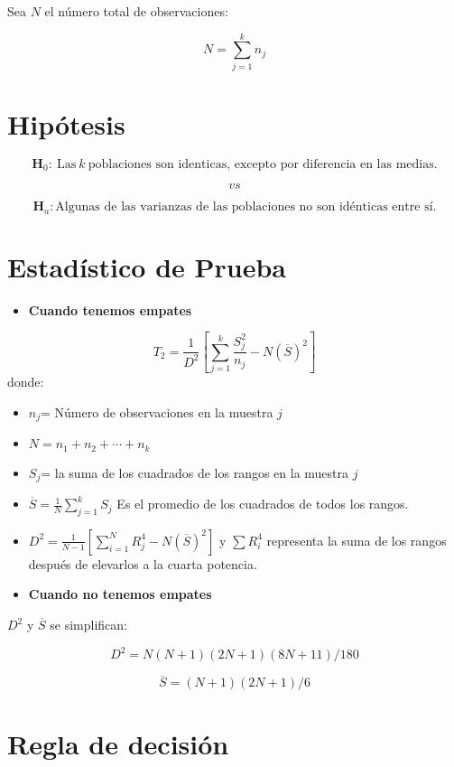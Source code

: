 \documentclass[
  a4paper,
  oneside,
  openany]{book}
\providecommand{\tightlist}{%
  \setlength{\itemsep}{0pt}\setlength{\parskip}{0pt}}
\begin{document}
Sea \(N\) el número total de observaciones:

\[N=\sum_{j=1}^k n_j\]

\hypertarget{hipuxf3tesis-8}{%
\section{Hipótesis}\label{hipuxf3tesis-8}}

\[\textbf{H}_0: \ \mbox{Las} \  k  \ \mbox{poblaciones son identicas, excepto por diferencia en las medias.}\]

\[vs\]

\[\textbf{H}_a: \mbox{Algunas de las varianzas de las poblaciones no son idénticas entre sí.}\]

\hypertarget{estaduxedstico-de-prueba-8}{%
\section{Estadístico de Prueba}\label{estaduxedstico-de-prueba-8}}

\begin{itemize}
\tightlist
\item
  \textbf{Cuando tenemos empates}
\end{itemize}

\[T_{2}= \frac{1}{D^2}\left[\sum_{j=1}^{k}\frac{S_{j}^2}{n_j}-N(\overline{S})^2\right]\]
donde:

\begin{itemize}
\item
  \(n_{j}\)= Número de observaciones en la muestra \(j\)
\item
  \(N= n_{1}+n_{2}+\cdots+n_{k}\)
\item
  \(S_{j}\)= la suma de los cuadrados de los rangos en la muestra \(j\)
\item
  \(\overline{S}= \frac{1}{N}\sum_{j=1}^{k}S_{j}\) Es el promedio de los cuadrados de todos los rangos.
\item
  \(D^2=\frac{1}{N-1}\left[\sum_{i=1}^{N}R^4_{j}-N(\overline{S})^2\right]\) y \(\sum{R_{i}^4}\) representa la suma de los rangos después de elevarlos a la cuarta potencia.
\item
  \textbf{Cuando no tenemos empates}
\end{itemize}

\(D^2\) y \(\overline{S}\) se simplifican:

\[D^2=N(N+1)(2N+1)(8N+11)/180\]

\[\overline{S}=(N+1)(2N+1)/6\]

\hypertarget{regla-de-decisiuxf3n-20}{%
\section{Regla de decisión}\label{regla-de-decisiuxf3n-20}}
\end{document}
